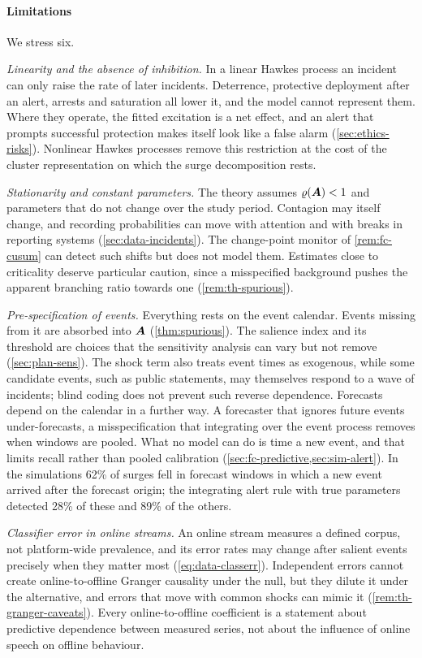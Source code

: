 \paragraph{Limitations}
We stress six.

\emph{Linearity and the absence of inhibition.} In a linear Hawkes process an
incident can only raise the rate of later incidents. Deterrence, protective
deployment after an alert, arrests and saturation all lower it, and the model
cannot represent them. Where they operate, the fitted excitation is a net
effect, and an alert that prompts successful protection makes itself look
like a false alarm (\cref{sec:ethics-risks}). Nonlinear Hawkes processes
\citep{bremaud1996} remove this restriction at the cost of the cluster
representation on which the surge decomposition rests.

\emph{Stationarity and constant parameters.} The theory assumes
$\varrho(\bm{A})<1$ and parameters that do not change over the study period.
Contagion may itself change, and recording probabilities can move with
attention and with breaks in reporting systems (\cref{sec:data-incidents}).
The change-point monitor of \cref{rem:fc-cusum} can detect such shifts but
does not model them. Estimates close to criticality deserve particular
caution, since a misspecified background pushes the apparent branching ratio
towards one (\cref{rem:th-spurious}).

\emph{Pre-specification of events.} Everything rests on the event calendar.
Events missing from it are absorbed into $\bm{A}$ (\cref{thm:spurious}). The
salience index and its threshold are choices that the sensitivity analysis
can vary but not remove (\cref{sec:plan-sens}). The shock term also treats
event times as exogenous, while some candidate events, such as public
statements, may themselves respond to a wave of incidents; blind coding does
not prevent such reverse dependence. Forecasts depend on the calendar in a
further way. A forecaster that ignores future events under-forecasts, a
misspecification that integrating over the event process removes when windows
are pooled. What no model can do is time a new event, and that limits recall
rather than pooled calibration (\cref{sec:fc-predictive,sec:sim-alert}). In
the simulations 62\% of surges fell in forecast windows in which a new event
arrived after the forecast origin; the integrating alert rule with true
parameters detected 28\% of these and 89\% of the others.

\emph{Classifier error in online streams.} An online stream measures a
defined corpus, not platform-wide prevalence, and its error rates may change
after salient events precisely when they matter most
(\cref{eq:data-classerr}). Independent errors cannot create online-to-offline
Granger causality under the null, but they dilute it under the alternative,
and errors that move with common shocks can mimic it
(\cref{rem:th-granger-caveats}). Every online-to-offline coefficient is a
statement about predictive dependence between measured series, not about the
influence of online speech on offline behaviour.

